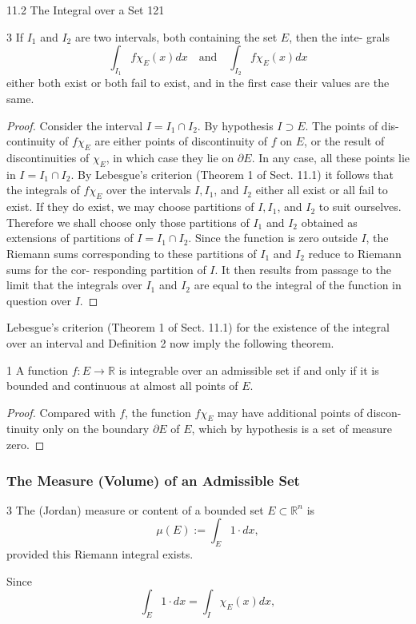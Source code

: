 11.2 The Integral over a Set
121
\begin{lemma}{3} If $I_1$ and $I_2$ are two intervals, both containing the set $E$, then the inte-
grals
$$\int_{I_1} f \chi_E(x)dx \quad \text{and} \quad \int_{I_2} f \chi_E(x)dx$$
either both exist or both fail to exist, and in the first case their values are the same.
\end{lemma}
\begin{proof} Consider the interval $I = I_1 \cap I_2$. By hypothesis $I \supset E$. The points of dis-
continuity of $f \chi_E$ are either points of discontinuity of $f$ on $E$, or the result of
discontinuities of $\chi_E$, in which case they lie on $\partial E$. In any case, all these points
lie in $I = I_1 \cap I_2$. By Lebesgue's criterion (Theorem 1 of Sect. 11.1) it follows that
the integrals of $f \chi_E$ over the intervals $I, I_1$, and $I_2$ either all exist or all fail to
exist. If they do exist, we may choose partitions of $I, I_1$, and $I_2$ to suit ourselves.
Therefore we shall choose only those partitions of $I_1$ and $I_2$ obtained as extensions
of partitions of $I = I_1 \cap I_2$. Since the function is zero outside $I$, the Riemann sums
corresponding to these partitions of $I_1$ and $I_2$ reduce to Riemann sums for the cor-
responding partition of $I$. It then results from passage to the limit that the integrals
over $I_1$ and $I_2$ are equal to the integral of the function in question over $I$.
\end{proof}
Lebesgue's criterion (Theorem 1 of Sect. 11.1) for the existence of the integral
over an interval and Definition 2 now imply the following theorem.
\begin{theorem}{1} A function $f : E \to \mathbb{R}$ is integrable over an admissible set if and only
if it is bounded and continuous at almost all points of $E$.
\end{theorem}
\begin{proof} Compared with $f$, the function $f \chi_E$ may have additional points of discon-
tinuity only on the boundary $\partial E$ of $E$, which by hypothesis is a set of measure
zero.
\end{proof}
\subsubsection{The Measure (Volume) of an Admissible Set}
\begin{definition}{3} The (Jordan) measure or content of a bounded set $E \subset \mathbb{R}^n$ is
$$\mu(E) := \int_E 1 \cdot dx,$$
provided this Riemann integral exists.
\end{definition}
Since
$$\int_E 1 \cdot dx = \int_I \chi_E(x) dx,$$